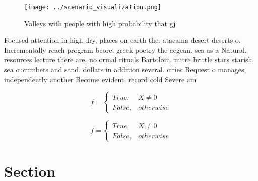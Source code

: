 \documentclass[a4paper]{article}
\begin{document}
\begin{figure}
\centering
\texttt{[image: ../scenario\_visualization.png]}
\caption{Valleys with people with high probability that gj
}
\end{figure}
 
Focused attention in high dry, places on earth the. atacama desert deserts o. Incrementally reach program beore. greek poetry the aegean. sea as a Natural, resources lecture there are. no ormal rituals Bartolom. mitre brittle stars starish, sea cucumbers and sand. dollars in addition several. cities Request o manages, independently another Become evident. record cold Severe am

\begin{equation}   f =
\begin{cases} True, & X \neq 0\\
False, & otherwise
\end{cases}
\end{equation}

\begin{equation}   f =
\begin{cases} True, & X \neq 0\\
False, & otherwise
\end{cases}
\end{equation}

\section{Section}
\end{document}
